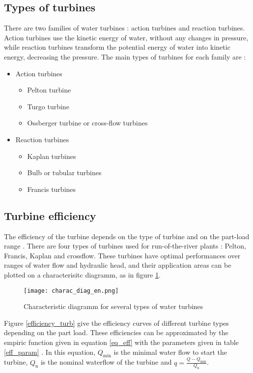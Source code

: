 \subsection{Types of turbines}

There are two families of water turbines : action turbines and reaction turbines. Action turbines use the kinetic energy of water, without any changes in pressure, while reaction turbines transform the potential energy of water into kinetic energy, decreasing the pressure. The main types of turbines for each family are \cite{quaschning} :
\begin{itemize}
 \item Action turbines
 \begin{itemize}
  \item Pelton turbine
  \item Turgo turbine
  \item Ossberger turbine or cross-flow turbines
 \end{itemize}
 \item Reaction turbines
 \begin{itemize}
  \item Kaplan turbines
  \item Bulb or tubular turbines
  \item Francis turbines
 \end{itemize}
\end{itemize}


\subsection{Turbine efficiency}

The efficiency of the turbine depends on the type of turbine and on the part-load range \cite{quaschning}\cite{pacer}. There are four types of turbines used for run-of-the-river plants : Pelton, Francis, Kaplan and crossflow. These turbines have optimal performances over ranges of water flow and hydraulic head, and their application areas can be plotted on a characterisitc diagramm, as in figure \ref{charac_diag}. 

\begin{figure}[H]
\texttt{[image: charac\_diag\_en.png]}
\caption[Characteristic diagramm for several types of water turbines]{Characteristic diagramm for several types of water turbines \cite{wiki_WK}}
\centering
\label{charac_diag}
\end{figure}

Figure \ref{efficiency_turb} give the efficiency curves of different turbine types depending on the part load. These efficiencies can be approximated by the empiric function given in equation \ref{eq_eff} with the parameters given in table \ref{eff_param} \cite{quaschning}. In this equation, $Q_\mathrm{min}$ is the minimal water flow to start the turbine, $Q_\mathrm{n}$ is the nominal waterflow of the turbine and $q=\frac{Q-Q_\mathrm{min}}{Q_\mathrm{n}}$.

